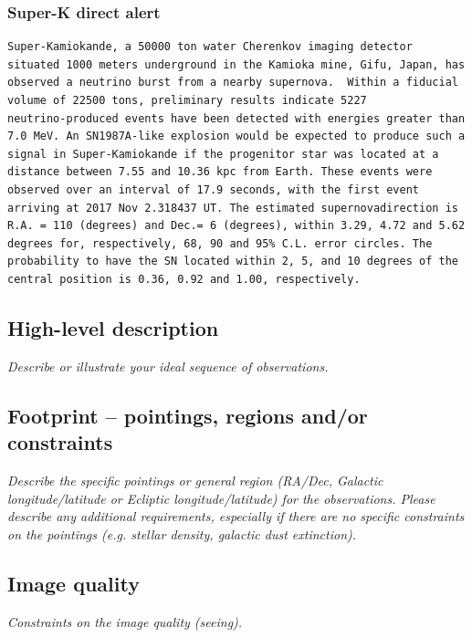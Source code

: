 \documentclass[11pt]{article}
\newcommand{\superk}  {Super\nobreakdash-K\xspace}
\begin{document}
\subsubsection{\superk direct alert}

\begin{verbatim}
Super-Kamiokande, a 50000 ton water Cherenkov imaging detector
situated 1000 meters underground in the Kamioka mine, Gifu, Japan, has
observed a neutrino burst from a nearby supernova.  Within a fiducial
volume of 22500 tons, preliminary results indicate 5227
neutrino-produced events have been detected with energies greater than
7.0 MeV. An SN1987A-like explosion would be expected to produce such a
signal in Super-Kamiokande if the progenitor star was located at a
distance between 7.55 and 10.36 kpc from Earth. These events were
observed over an interval of 17.9 seconds, with the first event
arriving at 2017 Nov 2.318437 UT. The estimated supernovadirection is
R.A. = 110 (degrees) and Dec.= 6 (degrees), within 3.29, 4.72 and 5.62
degrees for, respectively, 68, 90 and 95% C.L. error circles. The
probability to have the SN located within 2, 5, and 10 degrees of the
central position is 0.36, 0.92 and 1.00, respectively.
\end{verbatim}

\subsection{High-level description}
\begin{footnotesize}
{\it Describe or illustrate your ideal sequence of observations.}
\end{footnotesize}

\vspace{.3in}


\subsection{Footprint -- pointings, regions and/or constraints}
\begin{footnotesize}{\it Describe the specific pointings or general region (RA/Dec, Galactic longitude/latitude or 
Ecliptic longitude/latitude) for the observations. Please describe any additional requirements, especially if there
are no specific constraints on the pointings (e.g. stellar density, galactic dust extinction).}
\end{footnotesize}

\subsection{Image quality}
\begin{footnotesize}{\it Constraints on the image quality (seeing).}\end{footnotesize}
\end{document}
